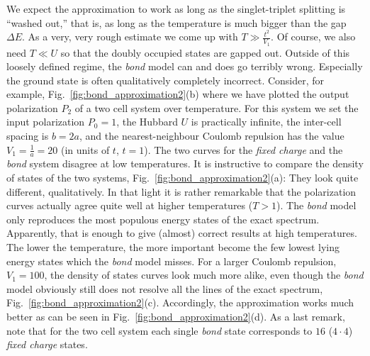 We expect the approximation to work as long as the
singlet-triplet splitting is ``washed out,'' that is, as long as the temperature
is much bigger than the gap $\Delta E$. As a very, very rough estimate we come
up with $T \gg \frac{t^2}{V_1}$. Of course, we also need $T \ll U$ so that the
doubly occupied states are gapped out. Outside of this loosely defined regime,
the \emph{bond} model can and does go terribly wrong. Especially the ground
state is often qualitatively completely incorrect. Consider, for example,
Fig.~\ref{fig:bond_approximation2}(b) where we have plotted the output
polarization $P_2$ of a two cell system over temperature. For this system we set
the input polarization $P_0 = 1$, the Hubbard $U$ is practically infinite, the
inter-cell spacing is $b = 2 a$, and the nearest-neighbour Coulomb repulsion has
the value $V_1 = \frac{1}{a} = 20$ (in units of $t$, $t=1$). The two curves for
the \emph{fixed charge} and the \emph{bond} system disagree at low temperatures.
It is instructive to compare the density of states of the two systems,
Fig.~\ref{fig:bond_approximation2}(a): They look quite different, qualitatively.
In that light it is rather remarkable that the polarization curves actually
agree quite well at higher temperatures ($T > 1$). The \emph{bond} model only
reproduces the most populous energy states of the exact spectrum. Apparently,
that is enough to give (almost) correct results at high temperatures. The lower
the temperature, the more important become the few lowest lying energy states
which the \emph{bond} model misses. For a larger Coulomb repulsion, $V_1 = 100$,
the density of states curves look much more alike, even though the \emph{bond}
model obviously still does not resolve all the lines of the exact spectrum,
Fig.~\ref{fig:bond_approximation2}(c). Accordingly, the approximation works much
better as can be seen in Fig.~\ref{fig:bond_approximation2}(d). As a last
remark, note that for the two cell system each single \emph{bond} state
corresponds to $16$ ($4 \cdot 4$) \emph{fixed charge} states.

